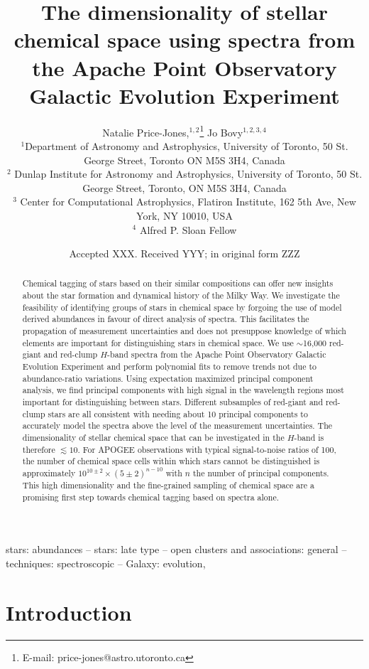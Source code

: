 \documentclass[a4paper,fleqn,usenatbib]{mnras}
\title[Dimensionality of chemical space]{The dimensionality of stellar chemical space using spectra from the Apache Point Observatory Galactic Evolution Experiment}
\author[Price-Jones \& Bovy]{
Natalie Price-Jones,$^{1,2}$\thanks{E-mail: price-jones@astro.utoronto.ca}
Jo Bovy$^{1,2,3,4}$
\\
$^{1}$Department of Astronomy and Astrophysics, University of Toronto, 50 St. George Street, Toronto ON M5S 3H4, Canada\\
$^{2}$ Dunlap Institute for Astronomy and Astrophysics, University of Toronto, 50 St. George Street, Toronto, ON M5S 3H4, Canada\\
$^{3}$ Center for Computational Astrophysics, Flatiron Institute, 162 5th Ave, New York, NY 10010, USA\\
$^{4}$ Alfred P. Sloan Fellow  
}
\date{Accepted XXX. Received YYY; in original form ZZZ}
\begin{document}
\label{firstpage}
\pagerange{\pageref{firstpage}--\pageref{lastpage}}
\maketitle

\begin{abstract}
	Chemical tagging of stars based on their similar compositions can offer new insights about the star formation and dynamical history of the Milky Way. We investigate the feasibility of identifying groups of stars in chemical space by forgoing the use of model derived abundances in favour of direct analysis of spectra. This facilitates the propagation of measurement uncertainties and does not presuppose knowledge of which elements are important for distinguishing stars in chemical space. We use $\sim$16,000 red-giant and red-clump $H$-band spectra from the Apache Point Observatory Galactic Evolution Experiment and perform polynomial fits to remove trends not due to abundance-ratio variations. Using expectation maximized principal component analysis, we find principal components with high signal in the wavelength regions most important for distinguishing between stars. Different subsamples of red-giant and red-clump stars are all consistent with needing about 10 principal components to accurately model the spectra above the level of the measurement uncertainties. The dimensionality of stellar chemical space that can be investigated in the $H$-band is therefore $\lesssim 10$. For APOGEE observations with typical signal-to-noise ratios of 100, the number of chemical space cells within which stars cannot be distinguished is approximately $10^{10\pm2} \times (5\pm 2)^{n-10}$ with $n$ the number of principal components. This high dimensionality and the fine-grained sampling of chemical space are a promising first step towards chemical tagging based on spectra alone.  
\end{abstract}

\begin{keywords}
stars: abundances -- stars: late type -- open clusters and associations: general -- techniques: spectroscopic -- Galaxy: evolution, 
\end{keywords}

\section{Introduction}
\end{document}
